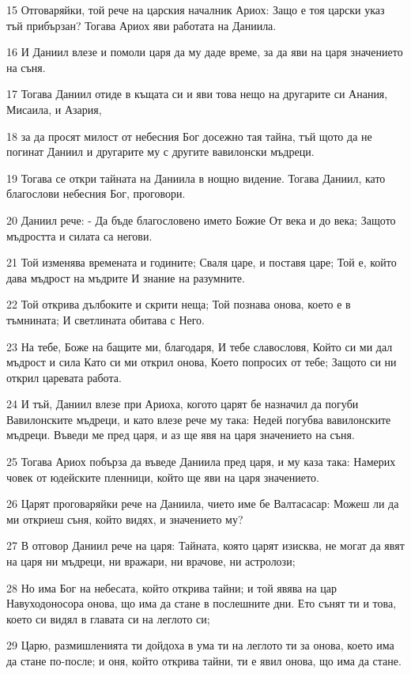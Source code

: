 \par 15 Отговаряйки, той рече на царския началник Ариох: Защо е тоя царски указ тъй прибързан? Тогава Ариох яви работата на Даниила.
\par 16 И Даниил влезе и помоли царя да му даде време, за да яви на царя значението на съня.
\par 17 Тогава Даниил отиде в къщата си и яви това нещо на другарите си Анания, Мисаила, и Азария,
\par 18 за да просят милост от небесния Бог досежно тая тайна, тъй щото да не погинат Даниил и другарите му с другите вавилонски мъдреци.
\par 19 Тогава се откри тайната на Даниила в нощно видение. Тогава Даниил, като благослови небесния Бог, проговори.
\par 20 Даниил рече: -  Да бъде благословено името Божие От века и до века; Защото мъдростта и силата са негови.
\par 21 Той изменява времената и годините; Сваля царе, и поставя царе; Той е, който дава мъдрост на мъдрите И знание на разумните.
\par 22 Той открива дълбоките и скрити неща; Той познава онова, което е в тъмнината; И светлината обитава с Него.
\par 23 На тебе, Боже на бащите ми, благодаря, И тебе славословя, Който си ми дал мъдрост и сила Като си ми открил онова, Което попросих от тебе; Защото си ни открил царевата работа.
\par 24 И тъй, Даниил влезе при Ариоха, когото царят бе назначил да погуби Вавилонските мъдреци, и като влезе рече му така: Недей погубва вавилонските мъдреци. Въведи ме пред царя, и аз ще явя на царя значението на съня.
\par 25 Тогава Ариох побърза да въведе Даниила пред царя, и му каза така: Намерих човек от юдейските пленници, който ще яви на царя значението.
\par 26 Царят проговаряйки рече на Даниила, чието име бе Валтасасар: Можеш ли да ми откриеш съня, който видях, и значението му?
\par 27 В отговор Даниил рече на царя: Тайната, която царят изисква, не могат да явят на царя ни мъдреци, ни вражари, ни врачове, ни астролози;
\par 28 Но има Бог на небесата, който открива тайни; и той явява на цар Навуходоносора онова, що има да стане в послешните дни. Ето сънят ти и това, което си видял в главата си на леглото си;
\par 29 Царю, размишленията ти дойдоха в ума ти на леглото ти за онова, което има да стане по-после; и оня, който открива тайни, ти е явил онова, що има да стане.
